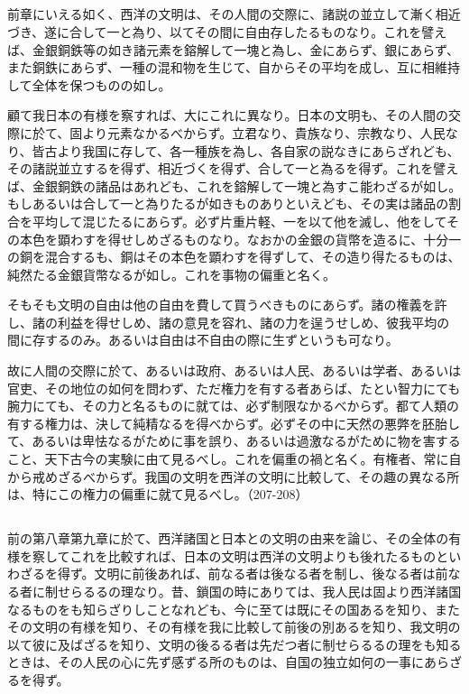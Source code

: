 \subsection{}


前章にいえる如く、西洋の文明は、その人間の交際に、諸説の並立して漸く相近づき、遂に合して一と為り、以てその間に自由存したるものなり。これを譬えば、金銀銅鉄等の如き諸元素を鎔解して一塊と為し、金にあらず、銀にあらず、また銅鉄にあらず、一種の混和物を生じて、自からその平均を成し、互に相維持して全体を保つものの如し。

顧て我日本の有様を察すれば、大にこれに異なり。日本の文明も、その人間の交際に於て、固より元素なかるべからず。立君なり、貴族なり、宗教なり、人民なり、皆古より我国に存して、各一種族を為し、各自家の説なきにあらざれども、その諸説並立するを得ず、相近づくを得ず、合して一と為るを得ず。これを譬えば、金銀銅鉄の諸品はあれども、これを鎔解して一塊と為すこ能わざるが如し。もしあるいは合して一と為りたるが如きものありといえども、その実は諸品の割合を平均して混じたるにあらず。必ず片重片軽、一を以て他を滅し、他をしてその本色を顕わすを得せしめざるものなり。なおかの金銀の貨幣を造るに、十分一の銅を混合するも、銅はその本色を顕わすを得ずして、その造り得たるものは、純然たる金銀貨幣なるが如し。これを事物の偏重と名く。

そもそも文明の自由は他の自由を費して買うべきものにあらず。諸の権義を許し、諸の利益を得せしめ、諸の意見を容れ、諸の力を逞うせしめ、彼我平均の間に存するのみ。あるいは自由は不自由の際に生ずというも可なり。

故に人間の交際に於て、あるいは政府、あるいは人民、あるいは学者、あるいは官吏、その地位の如何を問わず、ただ権力を有する者あらば、たとい智力にても腕力にても、その力と名るものに就ては、必ず制限なかるべからず。都て人類の有する権力は、決して純精なるを得べからず。必ずその中に天然の悪弊を胚胎して、あるいは卑怯なるがために事を誤り、あるいは過激なるがために物を害すること、天下古今の実験に由て見るべし。これを偏重の禍と名く。有権者、常に自から戒めざるべからず。我国の文明を西洋の文明に比較して、その趣の異なる所は、特にこの権力の偏重に就て見るべし。（207-208）

\subsection{}




前の第八章第九章に於て、西洋諸国と日本との文明の由来を論じ、その全体の有様を察してこれを比較すれば、日本の文明は西洋の文明よりも後れたるものといわざるを得ず。文明に前後あれば、前なる者は後なる者を制し、後なる者は前なる者に制せらるるの理なり。昔、鎖国の時にありては、我人民は固より西洋諸国なるものをも知らざりしことなれども、今に至ては既にその国あるを知り、またその文明の有様を知り、その有様を我に比較して前後の別あるを知り、我文明の以て彼に及ばざるを知り、文明の後るる者は先だつ者に制せらるるの理をも知るときは、その人民の心に先ず感ずる所のものは、自国の独立如何の一事にあらざるを得ず。


